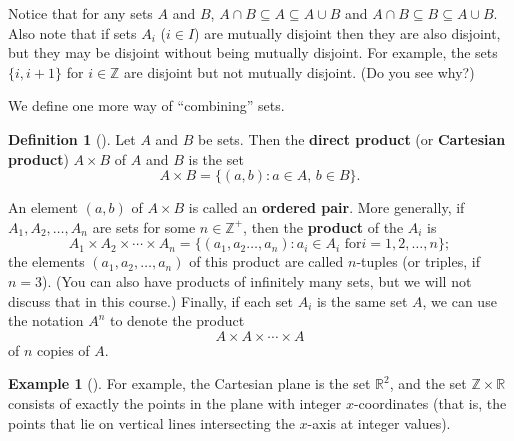\documentclass[10pt,]{book}
\newcommand{\terminology}[1]{\textbf{#1}}
\theoremstyle{plain}
\theoremstyle{definition}
\newtheorem{definition}[theorem]{Definition}
\theoremstyle{definition}
\theoremstyle{definition}
\newtheorem{example}[theorem]{Example}
\theoremstyle{definition}
\numberwithin{equation}{section}
\def\Z{\mathbb{Z}}
\def\R{\mathbb{R}}
\begin{document}
Notice that for any sets \(A\) and \(B\), \(A\cap B \subseteq A \subseteq A\cup B\) and \(A\cap B \subseteq B \subseteq A\cup B\). Also note that if sets \(A_i\) (\(i \in I\)) are mutually disjoint then they are also disjoint, but they may be disjoint without being mutually disjoint. For example, the sets \(\{i, i+1\}\) for \(i\in \Z\) are disjoint but not mutually disjoint. (Do you see why?)%
\par
We define one more way of ``combining'' sets.%
\begin{definition}[{}]\label{definition-6}
Let \(A\) and \(B\) be sets. Then the \terminology{direct product} (or \terminology{Cartesian product}) \(A\times B\) of \(A\) and \(B\) is the set%
\begin{equation*}
A\times B =
\{(a,b): \text{\(a\in A\), \(b\in B\)} \}.
\end{equation*}
%
\par
An element \((a,b)\) of \(A\times B\) is called an \terminology{ordered pair}. More generally, if \(A_1, A_2, \ldots, A_n\) are sets for some \(n\in \Z^+\), then the \terminology{product} of the \(A_i\) is%
\begin{equation*}
A_1\times A_2 \times \cdots
\times A_n=\{(a_1, a_2 \ldots, a_n): a_i \in A_i \text{ for
} i=1,2, \ldots, n\}; 
\end{equation*}
the elements \((a_1,a_2,\ldots,a_n)\) of this product are called \(n\)-tuples (or triples, if \(n=3\)). (You can also have products of infinitely many sets, but we will not discuss that in this course.) Finally, if each set \(A_i\) is the same set \(A\), we can use the notation \(A^n\) to denote the product%
\begin{equation*}
A\times A \times \cdots \times A
\end{equation*}
of \(n\) copies of \(A\).%
\label{notation-20}
\end{definition}
\begin{example}[]\label{example-4}
For example, the Cartesian plane is the set \(\R^2\), and the set \(\Z \times \R\) consists of exactly the points in the plane with integer \(x\)-coordinates (that is, the points that lie on vertical lines intersecting the \(x\)-axis at integer values).%
\end{example}
\typeout{************************************************}
\typeout{************************************************}
\end{document}
